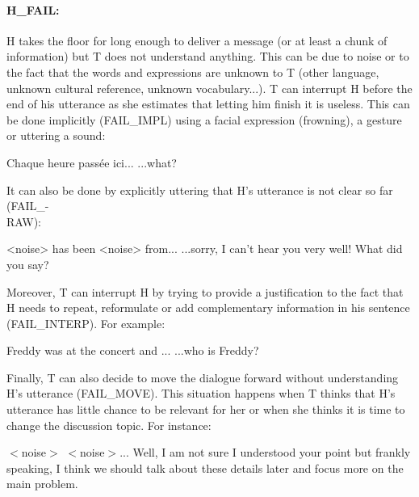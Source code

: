        \paragraph{H\_FAIL:} H takes the floor for long enough to deliver a message (or at least a chunk of information) but T does not understand anything. This can be due to noise or to the fact that the words and expressions are unknown to T (other language, unknown cultural reference, unknown vocabulary...). T can interrupt H before the end of his utterance as she estimates that letting him finish it is useless. This can be done implicitly (FAIL\_IMPL) using a facial expression (frowning), a gesture or uttering a sound:
				
					\begin{dialogue}
						 Chaque heure pass\'ee ici...
						 ...what?
					\end{dialogue}
					
					It can also be done by explicitly uttering that H's utterance is not clear so far (FAIL\_-\\RAW):
					
					\begin{dialogue}
						 <noise> has been <noise> from...
						 ...sorry, I can't hear you very well! What did you say?
					\end{dialogue}
					
					Moreover, T can interrupt H by trying to provide a justification to the fact that H needs to repeat, reformulate or add complementary information in his sentence (FAIL\_INTERP). For example:
					
					\begin{dialogue}
						 Freddy was at the concert and ...
						 ...who is Freddy?
					\end{dialogue}

                                        Finally, T can also decide to move the dialogue forward without understanding H's utterance (FAIL\_MOVE). This situation happens when T thinks that H's utterance has little chance to be relevant for her or when she thinks it is time to change the discussion topic. For instance:

                                        \begin{dialogue}
                                           $<$noise$>$ $<$noise$>$...
                                           Well, I am not sure I understood your point but frankly speaking, I think we should talk about these details later and focus more on the main problem.
                                        \end{dialogue}
					
